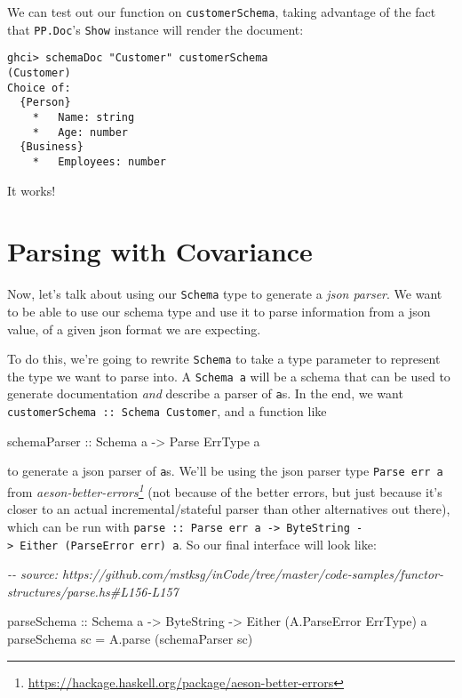 \documentclass[]{article}
\newenvironment{Shaded}{}{}
\newcommand{\CommentTok}[1]{\textcolor[rgb]{0.38,0.63,0.69}{\textit{#1}}}
\newcommand{\DataTypeTok}[1]{\textcolor[rgb]{0.56,0.13,0.00}{#1}}
\newcommand{\NormalTok}[1]{#1}
\newcommand{\OtherTok}[1]{\textcolor[rgb]{0.00,0.44,0.13}{#1}}
\renewcommand{\href}[2]{#2\footnote{\url{#1}}}
\begin{document}
We can test out our function on \texttt{customerSchema}, taking advantage of the
fact that \texttt{PP.Doc}'s \texttt{Show} instance will render the document:

\begin{verbatim}
ghci> schemaDoc "Customer" customerSchema
(Customer)
Choice of:
  {Person}
    *   Name: string
    *   Age: number
  {Business}
    *   Employees: number
\end{verbatim}

It works!

\hypertarget{parsing-with-covariance}{%
\section{Parsing with Covariance}\label{parsing-with-covariance}}

Now, let's talk about using our \texttt{Schema} type to generate a \emph{json
parser}. We want to be able to use our schema type and use it to parse
information from a json value, of a given json format we are expecting.

To do this, we're going to rewrite \texttt{Schema} to take a type parameter to
represent the type we want to parse into. A \texttt{Schema\ a} will be a schema
that can be used to generate documentation \emph{and} describe a parser of
\texttt{a}s. In the end, we want \texttt{customerSchema\ ::\ Schema\ Customer},
and a function like

\begin{Shaded}
\begin{Highlighting}[]
\OtherTok{schemaParser ::} \DataTypeTok{Schema}\NormalTok{ a }\OtherTok{{-}>} \DataTypeTok{Parse} \DataTypeTok{ErrType}\NormalTok{ a}
\end{Highlighting}
\end{Shaded}

to generate a json parser of \texttt{a}s. We'll be using the json parser type
\texttt{Parse\ err\ a} from
\emph{\href{https://hackage.haskell.org/package/aeson-better-errors}{aeson-better-errors}}
(not because of the better errors, but just because it's closer to an actual
incremental/stateful parser than other alternatives out there), which can be run
with
\texttt{parse\ ::\ Parse\ err\ a\ -\textgreater{}\ ByteString\ -\textgreater{}\ Either\ (ParseError\ err)\ a}.
So our final interface will look like:

\begin{Shaded}
\begin{Highlighting}[]
\CommentTok{{-}{-} source: https://github.com/mstksg/inCode/tree/master/code{-}samples/functor{-}structures/parse.hs\#L156{-}L157}

\OtherTok{parseSchema ::} \DataTypeTok{Schema}\NormalTok{ a }\OtherTok{{-}>} \DataTypeTok{ByteString} \OtherTok{{-}>} \DataTypeTok{Either}\NormalTok{ (}\DataTypeTok{A.ParseError} \DataTypeTok{ErrType}\NormalTok{) a}
\NormalTok{parseSchema sc }\OtherTok{=}\NormalTok{ A.parse (schemaParser sc)}
\end{Highlighting}
\end{Shaded}
\end{document}
